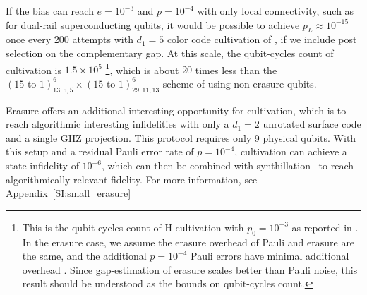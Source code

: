\documentclass[twocolumn,notitlepage,nofootinbib,floatfix,superscriptaddress]{revtex4-1}
\begin{document}
If the bias can reach $e=10^{-3}$ and $p=10^{-4}$ with only local connectivity, such as for dual-rail superconducting qubits, it would be possible to achieve $p_L\approx 10^{-15}$ once every 200 attempts with $d_1=5$  color code cultivation of \cite{gidney2024magic}, if we include post selection on the complementary gap. At this scale, the qubit-cycles count of cultivation is $1.5 \times 10^5$ \footnote{This is the qubit-cycles count of H cultivation with $p_0=10^{-3}$ as reported in \cite{gidney2024magic}.  In the erasure case, we assume the erasure overhead of Pauli and erasure are the same, and the additional $p=10^{-4}$ Pauli errors have minimal additional overhead \cite{jacoby2025magic}. Since gap-estimation of erasure scales better than Pauli noise, this result should be understood as the bounds on qubit-cycles count.}, which is about $20$ times less than the $\left(\text{15-to-1}\right)_{13,5,5}^{6}\times\left(\text{15-to-1}\right)_{29,11,13}^{6}$ scheme of \cite{litinski2019magic} using non-erasure qubits.

Erasure offers an additional interesting opportunity for cultivation, which is to reach algorithmic interesting infidelities with only a $d_1=2$ unrotated surface code and a single GHZ projection. This protocol requires only 9 physical qubits. With this setup and a residual Pauli error rate of $p=10^{-4}$, cultivation can achieve a state infidelity of $10^{-6}$, which can then be combined with synthillation~\cite{Jones_2013} to reach algorithmically relevant fidelity. For more information, see Appendix~\ref{SI:small_erasure}
\end{document}
